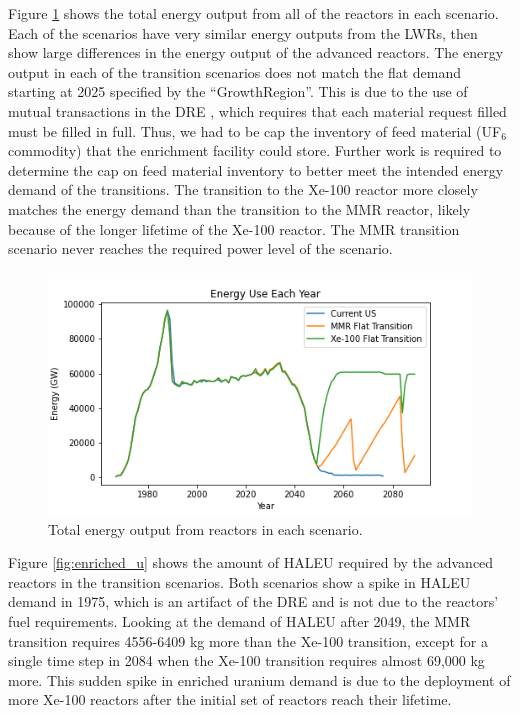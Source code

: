 Figure \ref{fig:energy} shows the total energy output from 
all of the reactors in each scenario. Each of the scenarios
have very similar energy outputs from the \gls{LWR}s, then 
show large differences in the energy output of the advanced 
reactors. The energy output in 
each of the transition scenarios does not match the flat demand 
starting at 2025 specified by the \Cycamore ``GrowthRegion''. 
This is due to 
the use of mutual transactions in the \gls{DRE} 
\cite{gidden_methodology_2016}, which requires that each 
material request filled must be filled in full. Thus, we had to be 
cap the inventory of feed material (UF$_6$ commodity) that 
the enrichment facility could store. Further work is required 
to determine the cap on feed material inventory to better meet 
the intended energy demand of the transitions. The transition to 
the Xe-100 reactor more closely matches the energy demand than the 
transition to the \gls{MMR} reactor, likely because of the 
longer lifetime of the Xe-100 reactor. The \gls{MMR} transition 
scenario never reaches the required power level of 
the scenario. 

\begin{figure}[ht]
    \centering
    \includegraphics[scale=0.5]{figures/energy_all.png}
    \caption{Total energy output from reactors in each scenario.}
    \label{fig:energy}
\end{figure}

Figure \ref{fig:enriched_u} shows the amount of \gls{HALEU} 
required by the advanced reactors in the transition scenarios. 
Both scenarios show a spike in \gls{HALEU} demand in 1975, which is
an artifact of the \gls{DRE} and is not due to the reactors' fuel 
requirements. Looking at the demand of \gls{HALEU} after 2049, the 
\gls{MMR} transition requires 4556-6409 kg more than the 
Xe-100 transition, except for a single time step in 2084 when 
the Xe-100 transition requires almost 69,000 kg more. This 
sudden spike in enriched uranium demand is due to the 
deployment of more Xe-100 reactors after the initial set 
of reactors reach their lifetime. 

